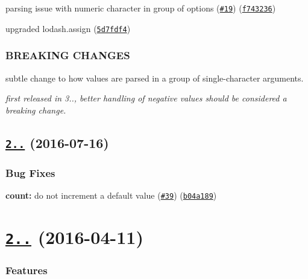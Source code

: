 \begin{DoxyItemize}
\item parsing issue with numeric character in group of options (\href{https://github.com/yargs/yargs-parser/issues/19}{\tt \#19}) (\href{https://github.com/yargs/yargs-parser/commit/f743236}{\tt f743236})
\item upgraded lodash.\+assign (\href{https://github.com/yargs/yargs-parser/commit/5d7fdf4}{\tt 5d7fdf4})
\end{DoxyItemize}

\subsubsection*{B\+R\+E\+A\+K\+I\+NG C\+H\+A\+N\+G\+ES}


\begin{DoxyItemize}
\item subtle change to how values are parsed in a group of single-\/character arguments.
\item {\itshape first released in 3.., better handling of negative values should be considered a breaking change.}
\end{DoxyItemize}

\label{_2.4.1}%
 \subsection*{\href{https://github.com/yargs/yargs-parser/compare/v2.4.0...v2.4.1}{\tt 2..} (2016-\/07-\/16)}

\subsubsection*{Bug Fixes}


\begin{DoxyItemize}
\item {\bfseries count\+:} do not increment a default value (\href{https://github.com/yargs/yargs-parser/issues/39}{\tt \#39}) (\href{https://github.com/yargs/yargs-parser/commit/b04a189}{\tt b04a189})
\end{DoxyItemize}

\label{_2.4.0}%
 \section*{\href{https://github.com/yargs/yargs-parser/compare/v2.3.0...v2.4.0}{\tt 2..} (2016-\/04-\/11)}

\subsubsection*{Features}


